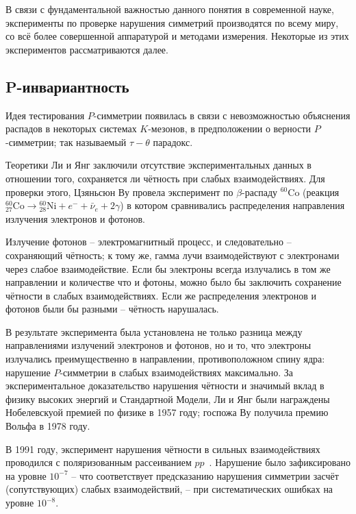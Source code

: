 \documentclass[14pt]{extarticle}
\begin{document}
В связи с фундаментальной важностью данного понятия в современной науке, эксперименты по проверке нарушения симметрий производятся по всему миру, со всё более совершенной аппаратурой и методами измерения. Некоторые из этих экспериментов рассматриваются далее.

\subsection{P-инвариантность}

Идея тестирования $P$-симметрии появилась в связи с невозможностью объяснения распадов в некоторых системах $K$-мезонов, в предположении о верности $P$-симметрии; так называемый $\tau-\theta$ парадокс.~\cite[стр. 43]{Symmetries}

Теоретики Ли и Янг заключили отсутствие экспериментальных данных в отношении того, сохраняется ли чётность при слабых взаимодействиях.\cite{Lee&Yang} Для проверки этого, Цзяньсюн Ву провела эксперимент по $\beta$-распаду $^{60}\mathrm{Co}$ (реакция ${^{60}_{27}\mathrm{Co}}\to {^{60}_{28}\mathrm{Ni}} + e^- + \bar{\nu}_e + 2\gamma $) в котором сравнивались распределения направления излучения электронов и фотонов.\cite{Wu}

Излучение фотонов -- электромагнитный процесс, и следовательно -- сохраняющий чётность; к тому же, гамма лучи взаимодействуют с электронами через слабое взаимодействие. Если бы электроны всегда излучались в том же направлении и количестве что и фотоны, можно было бы заключить сохранение чётности в слабых взаимодействиях. Если же распределения электронов и фотонов были бы разными -- чётность нарушалась.

В результате эксперимента была установлена не только разница между направлениями излучений электронов и фотонов, но и то, что электроны излучались преимущественно в направлении, противоположном спину ядра: нарушение $P$-симметрии в слабых взаимодействиях максимально.
%
За экспериментальное доказательство нарушения чётности и значимый вклад в физику высоких энергий и Стандартной Модели, Ли и Янг были награждены Нобелевскуой премией по физике в 1957 году; госпожа Ву получила премию Вольфа в 1978 году.

В 1991 году, эксперимент нарушения чётности в сильных взаимодействиях проводился с поляризованным рассеиванием $pp$~\cite{Eversheim}. Нарушение было зафиксировано на уровне $10^{-7}$ -- что соответствует предсказанию нарушения симметрии засчёт (сопутствующих) слабых взаимодействий, -- при систематических ошибках на уровне $10^{-8}$. 
\end{document}
